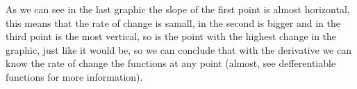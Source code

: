 \documentclass[12pt,journal]{IEEEtran}
\begin{document}

    As we can see in the last graphic the slope of the first point is almost
    horizontal, this means that the rate of change is samall, in the second
    is bigger and in the third point is the most vertical, so is the point with
    the highest change in the graphic, just like it would be, so we can
    conclude that with the derivative we can know the rate of change the
    functions at any point (almost, see defferentiable functions for more
    information).
\end{document}
